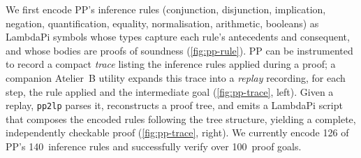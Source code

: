 \documentclass[11pt]{article}
\begin{document}
We first encode PP's inference rules
(conjunction, disjunction, implication,
negation, quantification, equality, normalisation,
arithmetic, booleans)
as LambdaPi symbols whose types capture
each rule's antecedents and consequent, and whose bodies
are proofs of soundness (\autoref{fig:pp-rule}).
PP can be instrumented to record a compact
\emph{trace} listing the inference rules applied
during a proof;
a companion Atelier~B utility expands this trace
into a \emph{replay} recording, for each step,
the rule applied and the intermediate goal
(\autoref{fig:pp-trace}, left).
Given a replay, \texttt{pp2lp} parses it,
reconstructs a proof tree, and emits a LambdaPi script
that composes the encoded rules following the tree structure,
yielding a complete, independently checkable proof
(\autoref{fig:pp-trace}, right).
We currently encode 126 of PP's 140~inference rules
and successfully verify over 100~proof goals.
\end{document}
